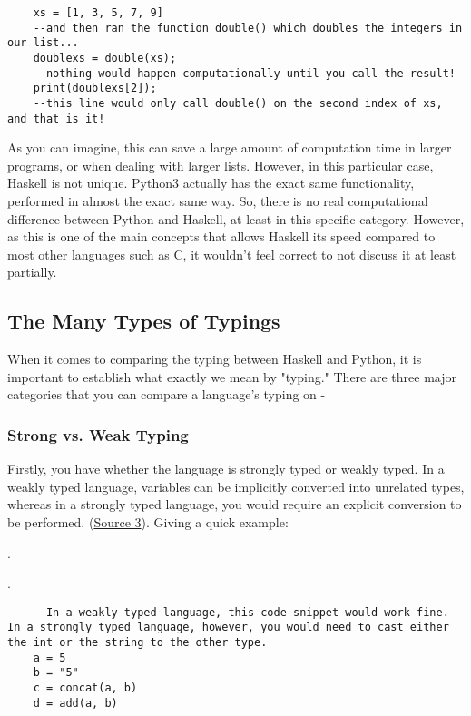 \documentclass{article}
\begin{document}
    \begin{lstlisting}
    xs = [1, 3, 5, 7, 9]
    --and then ran the function double() which doubles the integers in our list...
    doublexs = double(xs);
    --nothing would happen computationally until you call the result!
    print(doublexs[2]);
    --this line would only call double() on the second index of xs, and that is it! 
    \end{lstlisting}

    \medskip\noindent As you can imagine, this can save a large amount of computation time in larger programs, or when dealing with larger lists. However, in this particular case, Haskell is not unique. Python3 actually has the exact same functionality, performed in almost the exact same way. So, there is no real computational difference between Python and Haskell, at least in this specific category. However, as this is one of the main concepts that allows Haskell its speed compared to most other languages such as C, it wouldn't feel correct to not discuss it at least partially. 

    \subsection{The Many Types of Typings}
	
    When it comes to comparing the typing between Haskell and Python, it is important to establish what exactly we mean by "typing." There are three major categories that you can compare a language's typing on - 
    \subsubsection{Strong vs. Weak Typing}
    Firstly, you have whether the language is strongly typed or weakly typed. In a weakly typed language, variables can be implicitly converted into unrelated types, whereas in a strongly typed language, you would require an explicit conversion to be performed. (\href{https://pythonconquerstheuniverse.wordpress.com/2009/10/03/static-vs-dynamic-typing-of-programming-languages/} {Source 3}). Giving a quick example:
    
    \medskip .
    
    \medskip .
    
    \begin{lstlisting}
    --In a weakly typed language, this code snippet would work fine. In a strongly typed language, however, you would need to cast either the int or the string to the other type. 
    a = 5
    b = "5"
    c = concat(a, b)
    d = add(a, b)
    \end{lstlisting}
    
\end{document}
